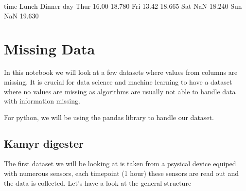 \documentclass[letterpaper,10pt,english]{jupyterBook}
\begin{document}
\begin{sphinxVerbatim}[commandchars=\\\{\}]
    
\end{sphinxVerbatim}

\begin{sphinxVerbatim}[commandchars=\\\{\}]
time  Lunch  Dinner
day                
Thur  16.00  18.780
Fri   13.42  18.665
Sat     NaN  18.240
Sun     NaN  19.630
\end{sphinxVerbatim}


\chapter{Missing Data}
\label{\detokenize{c2_data_preparation/missing_data:missing-data}}\label{\detokenize{c2_data_preparation/missing_data::doc}}
\sphinxAtStartPar
In this notebook we will look at a few datasets where values from columns are missing.
It is crucial for data science and machine learning to have a dataset where no values are missing as algorithms are usually not able to handle data with information missing.

\sphinxAtStartPar
For python, we will be using the pandas library to handle our dataset.

\begin{sphinxVerbatim}[commandchars=\\\{\}]
   
\end{sphinxVerbatim}


\section{Kamyr digester}
\label{\detokenize{c2_data_preparation/missing_data:kamyr-digester}}
\sphinxAtStartPar
The first dataset we will be looking at is taken from a psysical device equiped with numerous sensors, each timepoint (1 hour) these sensors are read out and the data is collected. Let’s have a look at the general structure
\end{document}
